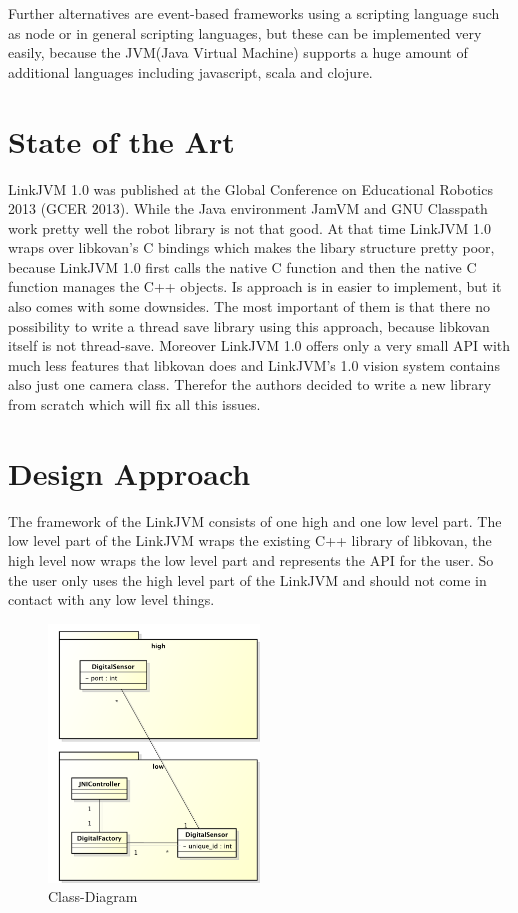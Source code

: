 \documentclass{juniorjournal}
\begin{document}
Further alternatives are event-based frameworks using a scripting language 
such as node\cite{node} or in general scripting languages, but these can be implemented very easily, 
because the JVM\cite{JVM}(Java\cite{Java} Virtual Machine) supports a huge amount of additional languages 
including javascript, scala and clojure.
%

\section{State of the Art}
LinkJVM 1.0\cite{linkjvm1.0} was published at the Global Conference on Educational Robotics 2013 (GCER\cite{GCER} 2013).
While the Java\cite{Java} environment JamVM and GNU Classpath\cite{GNU} work pretty well the robot library is not that good.
At that time LinkJVM 1.0\cite{linkjvm1.0} wraps over libkovan's\cite{libkovan} C bindings which makes the libary structure pretty poor, because LinkJVM 1.0\cite{linkjvm1.0} first calls the native C function and then the native C function manages the C++ objects.
Is approach is in easier to implement, but it also comes with some downsides.
The most important of them is that there no possibility to write a thread save library using this approach, because libkovan\cite{libkovan} itself is not thread-save.
Moreover LinkJVM 1.0\cite{linkjvm1.0} offers only a very small API with much less features that libkovan\cite{libkovan} does and LinkJVM's 1.0\cite{linkjvm1.0} vision system contains also just one camera class.
Therefor the authors decided to write a new library from scratch which will fix all this issues. 

\section{Design Approach}
\label{sec:design-approach}
The framework of the LinkJVM consists of one high and one low level part.
The low level part of the LinkJVM wraps the existing C++ library of libkovan\cite{libkovan}, 
the high level now wraps the low level part and represents the API for the user.
So the user only uses the high level part of the LinkJVM and should not come in 
contact with any low level things.

\begin{figure}[H]
\centering
\includegraphics[width=0.5\textwidth]{images/Class-Diagram.pdf}
\caption{Class-Diagram}
\label{fig:Class-Diagram}
\end{figure}
\end{document}
